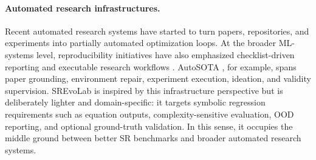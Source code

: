 \paragraph{Automated research infrastructures.}
Recent automated research systems have started to turn papers, repositories, and experiments into partially automated optimization loops. At the broader ML-systems level, reproducibility initiatives have also emphasized checklist-driven reporting and executable research workflows \citep{pineau2021improving}. AutoSOTA \citep{li2026autosota}, for example, spans paper grounding, environment repair, experiment execution, ideation, and validity supervision. SREvoLab is inspired by this infrastructure perspective but is deliberately lighter and domain-specific: it targets symbolic regression requirements such as equation outputs, complexity-sensitive evaluation, OOD reporting, and optional ground-truth validation. In this sense, it occupies the middle ground between better SR benchmarks and broader automated research systems.
